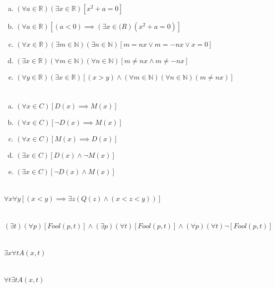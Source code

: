 \documentclass{article}
\begin{document}
\begin{enumerate}[(a)]
\item $(\forall a \in \mathbb{R})(\exists x \in \mathbb{R})[x^2 + a = 0]$
\item $(\forall a \in \mathbb{R})[(a < 0) \implies (\exists x \in \mathbb(R)(x^2 + a = 0)]$
\item $(\forall x \in \mathbb{R})(\exists m \in \mathbb{N})(\exists n \in \mathbb{N})[m = nx \vee m = -nx \vee x = 0]$
\item $(\exists x \in \mathbb{R})(\forall m \in \mathbb{N})(\forall n \in \mathbb{N})[m \neq nx \wedge m \neq -nx]$
\item $(\forall y \in \mathbb{R})(\exists x \in \mathbb{R})[(x > y) \wedge (\forall m \in \mathbb{N})(\forall n \in \mathbb{N})(m \neq nx)]$
\end{enumerate}

\section{}

\begin{enumerate}[(a)]
\item $(\forall x \in C)[D(x) \implies M(x)]$
\item $(\forall x \in C)[\neg D(x) \implies M(x)]$
\item $(\forall x \in C)[M(x) \implies D(x)]$
\item $(\exists x \in C)[D(x) \wedge \neg M(x)]$
\item $(\exists x \in C)[\neg D(x) \wedge M(x)]$
\end{enumerate}

\section{}

$\forall x \forall y[(x < y) \implies \exists z(Q(z) \wedge (x < z < y))]$

\section{}

$(\exists t)(\forall p)[Fool(p, t)] \wedge (\exists p)(\forall t)[Fool(p, t)] \wedge (\forall p)(\forall t)\neg[Fool(p, t)]$

\section{}

$\exists x \forall t A(x, t)$


\section{}

$\forall t \exists t A(x, t)$
\end{document}
